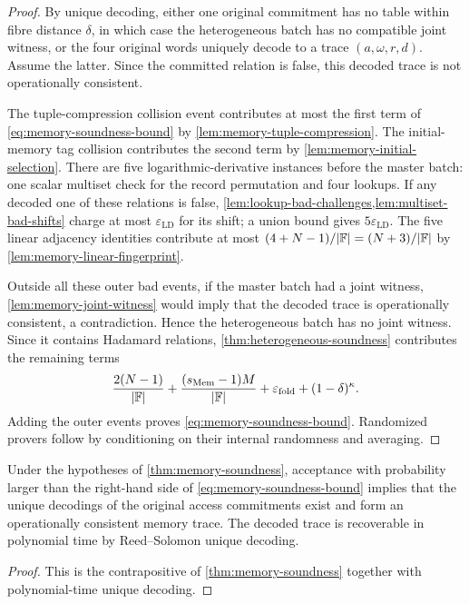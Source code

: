 \begin{proof}
By unique decoding, either one original commitment has no table within fibre distance $\delta$, in which case the heterogeneous batch has no compatible joint witness, or the four original words uniquely decode to a trace $(a,\omega,r,d)$.  Assume the latter.  Since the committed relation is false, this decoded trace is not operationally consistent.

The tuple-compression collision event contributes at most the first term of \eqref{eq:memory-soundness-bound} by \cref{lem:memory-tuple-compression}.  The initial-memory tag collision contributes the second term by \cref{lem:memory-initial-selection}.  There are five logarithmic-derivative instances before the master batch: one scalar multiset check for the record permutation and four lookups.  If any decoded one of these relations is false, \cref{lem:lookup-bad-challenges,lem:multiset-bad-shifts} charge at most $\varepsilon_{\mathrm{LD}}$ for its shift; a union bound gives $5\varepsilon_{\mathrm{LD}}$.  The five linear adjacency identities contribute at most $(4+N-1)/|\mathbb{F}|=(N+3)/|\mathbb{F}|$ by \cref{lem:memory-linear-fingerprint}.

Outside all these outer bad events, if the master batch had a joint witness, \cref{lem:memory-joint-witness} would imply that the decoded trace is operationally consistent, a contradiction.  Hence the heterogeneous batch has no joint witness.  Since it contains Hadamard relations, \cref{thm:heterogeneous-soundness} contributes the remaining terms
\[
  \frac{2(N-1)}{|\mathbb{F}|}
  +\frac{(s_{\mathrm{Mem}}-1)M}{|\mathbb{F}|}
  +\varepsilon_{\mathrm{fold}}
  +(1-\delta)^\kappa.
\]
Adding the outer events proves \eqref{eq:memory-soundness-bound}.  Randomized provers follow by conditioning on their internal randomness and averaging.
\end{proof}

\begin{corollary}
\label{cor:memory-knowledge}
Under the hypotheses of \cref{thm:memory-soundness}, acceptance with probability larger than the right-hand side of \eqref{eq:memory-soundness-bound} implies that the unique decodings of the original access commitments exist and form an operationally consistent memory trace.  The decoded trace is recoverable in polynomial time by Reed--Solomon unique decoding.
\end{corollary}

\begin{proof}
This is the contrapositive of \cref{thm:memory-soundness} together with polynomial-time unique decoding.
\end{proof}

